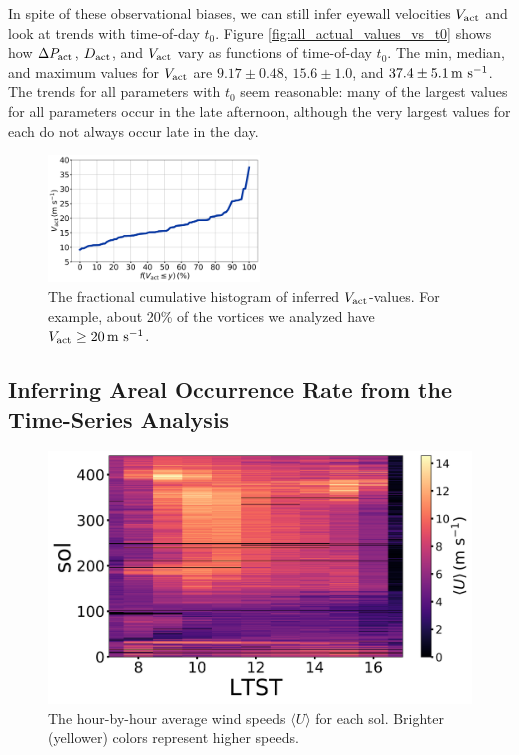 \documentclass{aastex63}
\begin{document}
In spite of these observational biases, we can still infer eyewall velocities $V_{\rm act}$ and look at trends with time-of-day $t_0$. Figure \ref{fig:all_actual_values_vs_t0} shows how $\Delta P_{\rm act}$, $D_{\rm act}$, and $V_{\rm act}$ vary as functions of time-of-day $t_0$. The min, median, and maximum values for $V_{\rm act}$ are $9.17\pm0.48$, $15.6\pm1.0$, and $37.4\pm5.1\,{\rm m\ s^{-1}}$. The trends for all parameters with $t_0$ seem reasonable: many of the largest values for all parameters occur in the late afternoon, although the very largest values for each do not always occur late in the day. 

\begin{figure}
    \centering
    \includegraphics[width=0.5\textwidth]{figures/cum_hist_Vact.png}
    \caption{The fractional cumulative histogram of inferred $V_{\rm act}$-values. For example, about 20\% of the vortices we analyzed have $V_{\rm act} \geq 20\,{\rm m\ s^{-1}}$.}
    \label{fig:cum_hist_Vact}
\end{figure}

\subsection{Inferring Areal Occurrence Rate from the Time-Series Analysis}
\label{sec:Inferring Areal Occurrence Rate from the Time-Series Analysis}

\begin{figure}
    \centering
    \includegraphics[width=\textwidth]{figures/advective_speeds.png}
    \caption{The hour-by-hour average wind speeds $\langle U \rangle$ for each sol. Brighter (yellower) colors represent higher speeds.}
    \label{fig:advective_speeds}
\end{figure}
\end{document}
